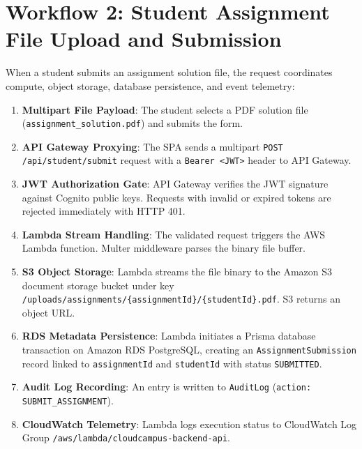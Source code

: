 \section{Workflow 2: Student Assignment File Upload and Submission}
When a student submits an assignment solution file, the request coordinates compute, object storage, database persistence, and event telemetry:
\begin{enumerate}
    \item \textbf{Multipart File Payload}: The student selects a PDF solution file (\texttt{assignment\_solution.pdf}) and submits the form.
    \item \textbf{API Gateway Proxying}: The SPA sends a multipart \texttt{POST /api/student/submit} request with a \texttt{Bearer <JWT>} header to API Gateway.
    \item \textbf{JWT Authorization Gate}: API Gateway verifies the JWT signature against Cognito public keys. Requests with invalid or expired tokens are rejected immediately with HTTP 401.
    \item \textbf{Lambda Stream Handling}: The validated request triggers the AWS Lambda function. Multer middleware parses the binary file buffer.
    \item \textbf{S3 Object Storage}: Lambda streams the file binary to the Amazon S3 document storage bucket under key \texttt{/uploads/assignments/\{assignmentId\}/\{studentId\}.pdf}. S3 returns an object URL.
    \item \textbf{RDS Metadata Persistence}: Lambda initiates a Prisma database transaction on Amazon RDS PostgreSQL, creating an \texttt{AssignmentSubmission} record linked to \texttt{assignmentId} and \texttt{studentId} with status \texttt{SUBMITTED}.
    \item \textbf{Audit Log Recording}: An entry is written to \texttt{AuditLog} (\texttt{action: SUBMIT\_ASSIGNMENT}).
    \item \textbf{CloudWatch Telemetry}: Lambda logs execution status to CloudWatch Log Group \texttt{/aws/lambda/cloudcampus-backend-api}.
\end{enumerate}

